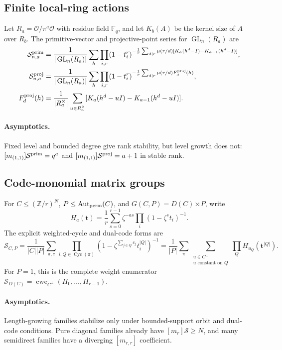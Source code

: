 \documentclass[10pt]{article}
\newcommand{\MGF}{\mathcal S}
\newcommand{\F}{\mathbb F}
\newcommand{\Aut}{\operatorname{Aut}}
\newcommand{\GL}{\operatorname{GL}}
\newcommand{\Cyc}{\operatorname{Cyc}}
\begin{document}
\subsection{Finite local-ring actions}
Let $R_a=\mathcal O/\pi^a\mathcal O$ with residue field $\F_q$, and let
$K_b(A)$ be the kernel size of $A$ over $R_b$.  The primitive-vector and
projective-point series for $\GL_n(R_a)$ are
\begin{align*}
 \MGF^{\rm prim}_{n,a}
 &=\frac1{|\GL_n(R_a)|}\sum_h\prod_{i,r}(1-t_i^r)^{-
 \frac1r\sum_{d\mid r}\mu(r/d)[K_a(h^d-I)-K_{a-1}(h^d-I)]},\\
 \MGF^{\rm proj}_{n,a}
 &=\frac1{|\GL_n(R_a)|}\sum_h\prod_{i,r}(1-t_i^r)^{-
 \frac1r\sum_{d\mid r}\mu(r/d)F_d^{\rm proj}(h)},\\
 F_d^{\rm proj}(h)
 &=\frac1{|R_a^\times|}\sum_{u\in R_a^\times}
 [K_a(h^d-uI)-K_{a-1}(h^d-uI)].
\end{align*}
\paragraph{Asymptotics.}
Fixed level and bounded degree give rank stability, but level growth does not:
$[m_{(1,1)}]\MGF^{\rm prim}=q^a$ and
$[m_{(1,1)}]\MGF^{\rm proj}=a+1$ in stable rank.

\subsection{Code-monomial matrix groups}
For $C\le(\mathbb Z/r)^N$, $P\le\Aut_{\rm perm}(C)$, and
$G(C,P)=D(C)\rtimes P$, write
\[
 H_a(\mathbf t)=\frac1r\sum_{s=0}^{r-1}\zeta^{-as}
 \prod_i(1-\zeta^st_i)^{-1}.
\]
The explicit weighted-cycle and dual-code forms are
\begin{equation}\label{eq:new-code}
 \boxed{\MGF_{C,P}=\frac1{|C||P|}\sum_{\pi,c}
 \prod_{i,Q\in\Cyc(\pi)}
 (1-\zeta^{\sum_{j\in Q}c_j}t_i^{|Q|})^{-1}
 =\frac1{|P|}\sum_\pi\sum_{\substack{u\in C^\perp\\u\text{ constant on }Q}}
 \prod_QH_{u_Q}(\mathbf t^{|Q|}).}
\end{equation}
For $P=1$, this is the complete weight enumerator
$\MGF_{D(C)}=\operatorname{cwe}_{C^\perp}(H_0,\ldots,H_{r-1})$.
\paragraph{Asymptotics.}
Length-growing families stabilize only under bounded-support orbit and
dual-code conditions.  Pure diagonal families already have
$[m_r]\MGF\ge N$, and many semidirect families have a diverging
$[m_{r,r}]$ coefficient.
\end{document}
